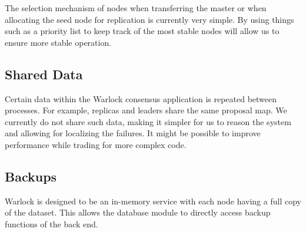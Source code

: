 The selection mechanism of nodes when transferring the master or when
allocating the seed node for replication is currently very simple.
By using things such as a priority list to keep track of the most stable
nodes will allow us to ensure more stable operation.

\subsection{Shared Data}

Certain data within the Warlock consensus application is repeated between
processes. For example, replicas and leaders share the same proposal map.
We currently do not share such data, making it simpler for us
to reason the system and allowing for localizing the failures. It might
be possible to improve performance while trading for more complex code.

\subsection{Backups}

Warlock is designed to be an in-memory service with each node having a full copy
of the dataset. This allows the database module to directly access
backup functions of the back end.

